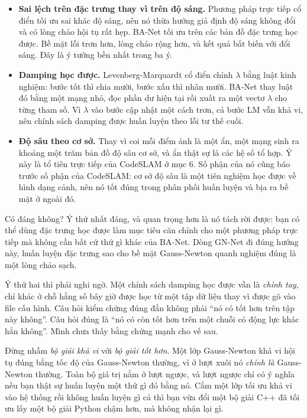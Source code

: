 \documentclass[../../deep_learning.tex]{subfiles}
\begin{document}
\begin{itemize}
\item \textbf{Sai lệch trên đặc trưng thay vì trên độ sáng.} Phương pháp trực tiếp cổ điển tối ưu sai khác độ sáng, nên nó thừa hưởng giả định độ sáng không đổi và có lòng chảo hội tụ rất hẹp. BA-Net tối ưu trên các bản đồ đặc trưng học được. Bề mặt lỗi trơn hơn, lòng chảo rộng hơn, và kết quả bất biến với đổi sáng. Đây là ý tưởng bền nhất trong ba ý.
\item \textbf{Damping học được.} Levenberg-Marquardt cổ điển chỉnh \(\lambda\) bằng luật kinh nghiệm: bước tốt thì chia mười, bước xấu thì nhân mười. BA-Net thay luật đó bằng một mạng nhỏ, đọc phần dư hiện tại rồi xuất ra một vectơ \(\lambda\) cho từng tham số. Vì \(\lambda\) vào bước cập nhật một cách trơn, cả bước LM vẫn khả vi, nên chính sách damping được huấn luyện theo lỗi tư thế cuối.
\item \textbf{Độ sâu theo cơ sở.} Thay vì coi mỗi điểm ảnh là một ẩn, một mạng sinh ra khoảng một trăm bản đồ độ sâu cơ sở, và ẩn thật sự là các hệ số tổ hợp. Ý này là tổ tiên trực tiếp của CodeSLAM ở mục 6. Số phận của nó cũng báo trước số phận của CodeSLAM: cơ sở độ sâu là một tiên nghiệm học được về hình dạng cảnh, nên nó tốt đúng trong phân phối huấn luyện và bịa ra bề mặt ở ngoài đó.
\end{itemize}

Có đáng không? Ý thứ nhất đáng, và quan trọng hơn là nó tách rời được: bạn có thể dùng đặc trưng học được làm mục tiêu căn chỉnh cho một phương pháp trực tiếp mà không cần bất cứ thứ gì khác của BA-Net. Dòng GN-Net đi đúng hướng này, huấn luyện đặc trưng sao cho bề mặt Gauss-Newton quanh nghiệm đúng là một lòng chảo sạch.

Ý thứ hai thì phải nghi ngờ. Một chính sách damping học được vẫn là \emph{chỉnh tay}, chỉ khác ở chỗ hằng số bây giờ được học từ một tập dữ liệu thay vì được gõ vào file cấu hình. Câu hỏi kiểm chứng đúng đắn không phải ``nó có tốt hơn trên tập này không''. Câu hỏi đúng là ``nó có còn tốt hơn trên một chuỗi có động lực khác hẳn không''. Mình chưa thấy bằng chứng mạnh cho vế sau.

\begin{cambay}
Đừng nhầm \emph{bộ giải khả vi} với \emph{bộ giải tốt hơn}. Một lớp Gauss-Newton khả vi hội tụ đúng bằng tốc độ của Gauss-Newton thường, vì ở lượt xuôi nó \emph{chính là} Gauss-Newton thường. Toàn bộ giá trị nằm ở lượt ngược, và lượt ngược chỉ có ý nghĩa nếu bạn thật sự huấn luyện một thứ gì đó bằng nó. Cắm một lớp tối ưu khả vi vào hệ thống rồi không huấn luyện gì cả thì bạn vừa đổi một bộ giải C++ đã tối ưu lấy một bộ giải Python chậm hơn, mà không nhận lại gì.
\end{cambay}
\end{document}
